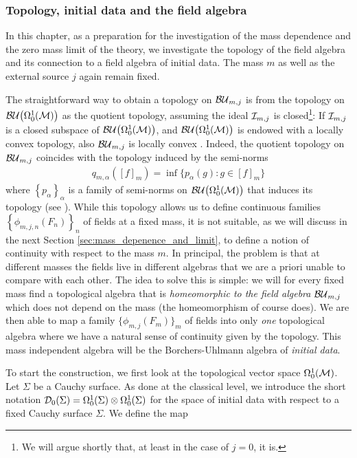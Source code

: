 \subsubsection{Topology, initial data and the field algebra}\label{sec:field-algebra-topology}
In this chapter, as a preparation for the investigation of the mass dependence and the zero mass limit of the theory, we investigate the topology of the field algebra and its connection to a field algebra of initial data. The mass $m$ as well as the external source $j$ again remain fixed.\par
The straightforward way to obtain a topology on ${\mathcal{BU}_{m,j}}$ is from the topology on ${\mathcal{BU}\big(\Omega^1_0(\mathcal{M})\big)}$ as the quotient topology, assuming the ideal $\mathcal{I}_{m,j}$ is closed\footnote{We will argue shortly that, at least in the case of $j=0$, it is.}:
If $\mathcal{I}_{m,j}$ is a closed subspace of ${\mathcal{BU}\big(\Omega^1_0(\mathcal{M})\big)}$, and ${\mathcal{BU}\big(\Omega^1_0(\mathcal{M})\big)}$ is endowed with a locally convex topology, also ${\mathcal{BU}_{m,j}}$ is locally convex \cite[Theorem 12.14.8]{dieudonne_2}. Indeed, the quotient topology on ${\mathcal{BU}_{m,j}}$ coincides with the topology induced by the semi-norms
\begin{align}
	q_{m, \alpha}( [f]_m ) = \inf\big\{ p_\alpha(g) : g \in [f]_m \big\}
\end{align}
where $\left\{ p_\alpha\right\}_\alpha $ is a family of semi-norms on ${\mathcal{BU}\big(\Omega^1_0(\mathcal{M})\big)}$ that induces its topology (see \cite[Lemma 12.14.8]{dieudonne_2}).
While this topology allows us to define continuous families $\left\{ \phi_{m,j,n}(F_n)\right\}_n$ of fields at a fixed mass, it is not suitable, as we will discuss in the next Section \ref{sec:mass_depenence_and_limit}, to define a notion of continuity with respect to the mass $m$.
In principal, the problem is that at different masses the fields live in different algebras that we are a priori unable to compare with each other. The idea to solve this is simple: we will for every fixed mass find a topological algebra that is \emph{homeomorphic to the field algebra} ${\mathcal{BU}_{m,j}}$ which does not depend on the mass (the homeomorphism of course does). We are then able to map a family $\{ \phi_{m,j} (F_m)\}_m$ of fields into only \emph{one} topological algebra where we have a natural sense of continuity given by the topology. This mass independent algebra will be the Borchers-Uhlmann algebra of \emph{initial data}.\par
To start the construction, we first look at the  topological vector space $\Omega^1_0(\mathcal{M})$. Let $\Sigma$ be a Cauchy surface. As done at the classical level, we introduce the short notation
$\mathcal{D}_{0}(\Sigma) = \Omega^1_0(\Sigma) \otimes \Omega^1_0(\Sigma)$ for the space of initial data with respect to a fixed Cauchy surface $\Sigma$. We define the map
